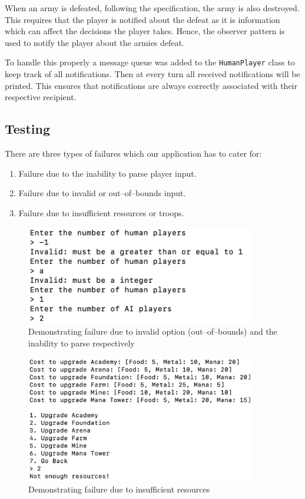 \documentclass[12pt]{article}
\begin{document}
When an army is defeated, following the specification, the army
is also destroyed. This requires that the player is notified
about the defeat as it is information which can affect the
decisions the player takes. Hence, the observer pattern is used
to notify the player about the armies defeat.

To handle this properly a message queue was added to the
\texttt{HumanPlayer} class to keep track of all notifications.
Then at every turn all received notifications will be printed.
This ensures that notifications are always correctly associated
with their respective recipient.

\subsection{Testing}

There are three types of failures which our application has
to cater for:

\begin{enumerate}
    \item Failure due to the inability to parse player input.
    \item Failure due to invalid or out--of--bounds input.
    \item Failure due to insufficient resources or troops.
\end{enumerate}

\begin{figure}[H]
    \centering
    \includegraphics[width=10cm]{./images/invalid-user-input-village-war-game.png}
    \caption{Demonstrating failure due to invalid option
    (out--of--bounds) and the inability to parse respectively}
\end{figure}

\begin{figure}[H]
    \centering
    \includegraphics[width=10cm]{./images/not-enough-resources-village-war-game.png}
    \caption{Demonstrating failure due to insufficient
    resources}
\end{figure}
\end{document}
